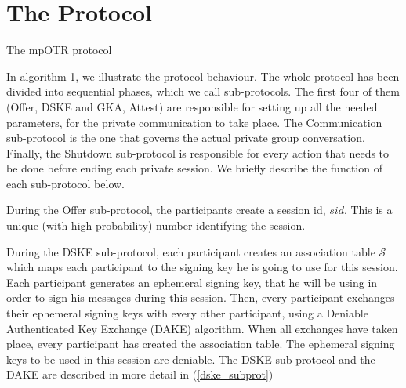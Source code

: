 \documentclass[]{article}
\begin{document}
\section{The Protocol}
\begin{algorithm}[h]
	\caption{The mpOTR protocol}
	\label{mpotr_algo}
\end{algorithm}

In algorithm 1, we illustrate the protocol behaviour.
The whole protocol has been divided into sequential phases, which we call sub-protocols.
The first four of them (Offer, DSKE and GKA, Attest) are responsible for setting up all the needed parameters, for the private communication to take place.
The Communication sub-protocol is the one that governs the actual private group conversation.
Finally, the Shutdown sub-protocol is responsible for every action that needs to be done before ending each private session.
We briefly describe the function of each sub-protocol below.

During the Offer sub-protocol, the participants create a session id, $sid$.
This is a unique (with high probability) number identifying the session.

During the DSKE sub-protocol, each participant creates an association table $\mathcal{S}$ which maps each participant to the signing key he is going to use for this session.
Each participant generates an ephemeral signing key, that he will be using in order to sign his messages during this session.
Then, every participant exchanges their ephemeral signing keys with every other participant, using a Deniable Authenticated Key Exchange (DAKE) algorithm.
When all exchanges have taken place, every participant has created the association table.
The ephemeral signing keys to be used in this session are deniable.
The DSKE sub-protocol and the DAKE are described in more detail in (\ref{dske_subprot})
\end{document}
